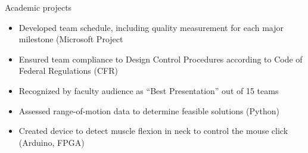 \documentclass{resume} %
\begin{document}
\begin{workSection}{Academic projects}
     \customItem[
        title=Hand Cycle for Polio Victims,
        duration=Fall 2019 – Spring 2020,
        keyHighlight=Collaborated in a team of three to design model of custom hand cycle for polio victims (SOLIDWORKS).
     ]
     \begin{itemize}
        \vspace{-0.5em}
        \itemsep -6pt {} 
        \item Developed team schedule, including quality measurement for each major milestone (Microsoft Project
        \item Ensured team compliance to Design Control Procedures according to Code of Federal Regulations (CFR)
        \item Recognized by faculty audience as “Best Presentation” out of 15 teams
     \end{itemize}

     \customItem[
        title=Sensor for Quadriplegic Patients,
        duration=Spring 2019,
        keyHighlight=Led team of three to design and develop a mouse-like device to allow quadriplegic patients to use websites.
     ]
     \begin{itemize}
        \vspace{-0.5em}
        \itemsep -6pt {} 
        \item Assessed range-of-motion data to determine feasible solutions (Python)
        \item Created device to detect muscle flexion in neck to control the mouse click (Arduino, FPGA)
     \end{itemize}
\end{workSection}
\end{document}
